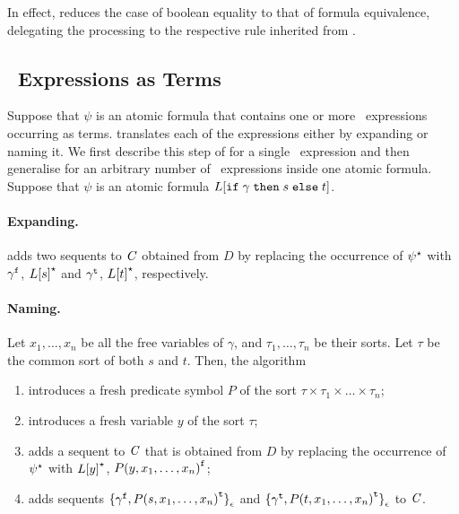 In effect, \nfcnf{} reduces the case of boolean equality to that of formula equivalence, 
delegating the processing to the respective rule inherited from \newcnf.


\subsection*{\ITE\ Expressions as Terms}
\label{subsect:term-ite}
Suppose that $\psi$ is an atomic formula that contains one or more \ITE\ expressions occurring as terms. \nfcnf{} translates each of the expressions either by expanding or naming it. 
We first describe this step of \nfcnf{} for a single \ITE\ expression and then generalise for an arbitrary number of \ITE\ expressions inside one atomic formula. Suppose that $\psi$ is an atomic formula $L[\mathtt{if}\;{\gamma}\;\allowbreak\mathtt{then}\;{s}\;\allowbreak\mathtt{else}\;{t}]$.

\paragraph{Expanding.} \nfcnf{} adds two sequents to $\mathit{C}$ obtained from $D$ by replacing the occurrence of ${\psi}^{\star}$ with ${\gamma}^{\mathtt{f}}$, ${L[s]}^{\star}$ and ${\gamma}^{\mathtt{t}}$, ${L[t]}^{\star}$, respectively.
    
\paragraph{Naming.} Let $x_1,\ldots,x_n$ be all the free variables of $\gamma$, and $\tau_1,\ldots,\tau_n$ be their sorts. Let $\tau$ be the common sort of both $s$ and $t$. Then, the \nfcnf{} algorithm 
\begin{enumerate}
  \item introduces a fresh predicate symbol $P$ of the sort $\tau\times\tau_1\times\ldots\times\tau_n$;
  \item introduces a fresh variable $y$ of the sort $\tau$;
  \item adds a sequent to $\mathit{C}$ that is obtained from $D$ by replacing the occurrence of ${\psi}^{\star}$ with ${L[y]}^{\star}$, ${P(y,x_1,\ldots,x_n)}^{\mathtt{f}}$;
  \item adds sequents ${\{{\gamma}^{\mathtt{f}},{P(s,x_1,\ldots,x_n)}^{\mathtt{t}}\}}_{\epsilon}$ and ${\{{\gamma}^{\mathtt{t}},\allowbreak{P(t,\allowbreak x_1,\allowbreak \ldots,x_n)}^{\mathtt{t}}\}}_{\epsilon}$ to $\mathit{C}$.
\end{enumerate}

